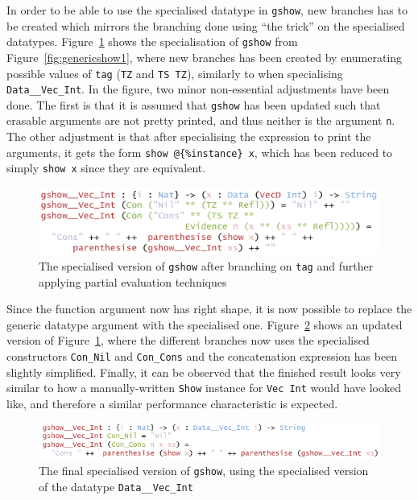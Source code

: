 \documentclass{ituthesis}
\newcommand{\ttconstructor}[1]{\textcolor{constructor-color}{\texttt{#1}}}
\newcommand{\tttype}[1]{\textcolor{type-color}{\texttt{#1}}}
\newcommand{\ttdec}[1]{\textcolor{declared-var-color}{\texttt{#1}}}
\newcommand{\ttvar}[1]{\textcolor{local-var-color}{\texttt{#1}}}
\newcommand{\ttliteral}[1]{\textcolor{literal-color}{\texttt{#1}}}
\theoremstyle{break}
\begin{document}
In order to be able to use the specialised datatype in \ttdec{gshow}, new branches has to be created which mirrors the branching done using ``the trick'' on the specialised datatypes.
Figure~\ref{fig:genericshow2} shows the specialisation of \ttdec{gshow} from Figure~\ref{fig:genericshow1}, where new branches has been created by enumerating possible values of \ttvar{tag} (\ttconstructor{TZ} and \ttconstructor{TS TZ}), similarly to when specialising \tttype{Data\_\_Vec\_Int}.
In the figure, two minor non-essential adjustments have been done. 
The first is that it is assumed that \ttdec{gshow} has been updated such that erasable arguments are not pretty printed, and thus neither is the argument \ttvar{n}.
The other adjustment is that after specialising the expression to print the arguments, it gets the form \ttdec{show}~\texttt{@\{}\ttliteral{\%instance}\texttt{\}}~\ttvar{x}, which has been reduced to simply \ttdec{show}~\ttvar{x} since they are equivalent.

\begin{figure}[ht]
\begin{center}
    \includegraphics[scale=0.5]{Figures/PEGenericShow2.png}
\end{center}
\caption{The specialised version of \ttdec{gshow} after branching on \ttvar{tag} and further applying partial evaluation techniques}
\label{fig:genericshow2}
\end{figure}

Since the function argument now has right shape, it is now possible to replace the generic datatype argument with the specialised one.
Figure~\ref{fig:genericshow3} shows an updated version of Figure~\ref{fig:genericshow2}, where the different branches now uses the specialised constructors \ttconstructor{Con\_Nil} and \ttconstructor{Con\_Cons} and the concatenation expression has been slightly simplified.
Finally, it can be observed that the finished result looks very similar to how a manually-written \tttype{Show} instance for \tttype{Vec}~\tttype{Int} would have looked like, and therefore a similar performance characteristic is expected.

\begin{figure}[ht]
\begin{center}
    \includegraphics[scale=0.5]{Figures/PEGenericShow3.png}
\end{center}
\caption{The final specialised version of \ttdec{gshow}, using the specialised version of the datatype \tttype{Data\_\_Vec\_Int}}
\label{fig:genericshow3}
\end{figure}
\end{document}
